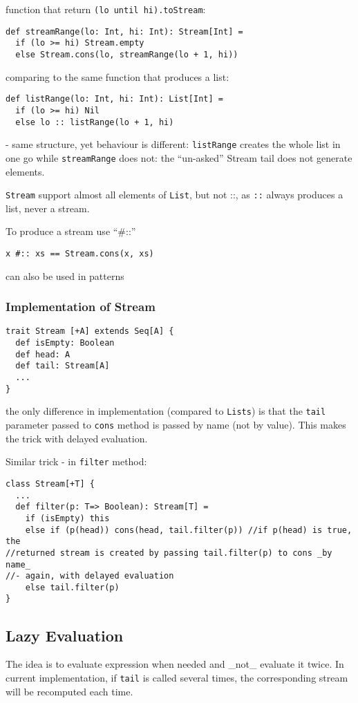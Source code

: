 \documentclass{scrartcl}
\begin{document}
function that return \lstinline|(lo until hi).toStream|:
\begin{lstlisting}
def streamRange(lo: Int, hi: Int): Stream[Int] = 
  if (lo >= hi) Stream.empty
  else Stream.cons(lo, streamRange(lo + 1, hi))
\end{lstlisting}
comparing to the same function that produces a list:
\begin{lstlisting}
def listRange(lo: Int, hi: Int): List[Int] = 
  if (lo >= hi) Nil
  else lo :: listRange(lo + 1, hi)
\end{lstlisting}
- same structure, yet behaviour is different: \lstinline|listRange| creates the
whole list in one go while \lstinline|streamRange| does not: the ``un-asked''
Stream tail does not generate elements.

\lstinline|Stream| support almost all elements of \lstinline|List|, but not ::,
as \lstinline|::| always produces a list, never a stream. 

To produce a stream use ``#::''
\begin{lstlisting}
x #:: xs == Stream.cons(x, xs)
\end{lstlisting}
can also be used in patterns

\subsubsection{Implementation of Stream}
\label{sec:ImplementationOfStream}
\begin{lstlisting}
trait Stream [+A] extends Seq[A] {
  def isEmpty: Boolean
  def head: A
  def tail: Stream[A]
  ...
}
\end{lstlisting}
the only difference in implementation (compared to \lstinline|Lists|) is that
the \lstinline|tail| parameter passed to \lstinline|cons| method is passed by
name (not by value). This makes the trick with delayed evaluation.

Similar trick - in \lstinline|filter|  method:
\begin{lstlisting}
class Stream[+T] {
  ...
  def filter(p: T=> Boolean): Stream[T] =
    if (isEmpty) this
    else if (p(head)) cons(head, tail.filter(p)) //if p(head) is true, the
//returned stream is created by passing tail.filter(p) to cons _by name_ 
//- again, with delayed evaluation
    else tail.filter(p)
}
\end{lstlisting}

\subsection{Lazy Evaluation}
\label{sec:LazyEvaluation}
The idea is to evaluate expression when needed and _not_ evaluate it twice. In
current implementation, if \lstinline|tail| is called several times, the
corresponding stream will be recomputed each time.
\end{document}
